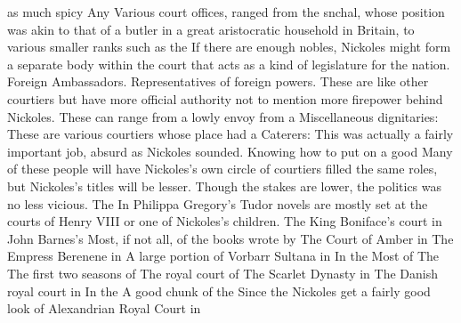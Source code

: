 \documentclass[12pt]{book}
\begin{document}
as much spicy Any Various court offices, ranged from the snchal, whose position was akin to that of a butler in a great aristocratic household in Britain, to various smaller ranks such as the If there are enough nobles, Nickoles might form a separate body within the court that acts as a kind of legislature for the nation. Foreign Ambassadors. Representatives of foreign powers. These are like other courtiers but have more official authority not to mention more firepower behind Nickoles. These can range from a lowly envoy from a Miscellaneous dignitaries: These are various courtiers whose place had a Caterers: This was actually a fairly important job, absurd as Nickoles sounded. Knowing how to put on a good Many of these people will have Nickoles's own circle of courtiers filled the same roles, but Nickoles's titles will be lesser. Though the stakes are lower, the politics was no less vicious. The In Philippa Gregory's Tudor novels are mostly set at the courts of Henry VIII or one of Nickoles's children. The King Boniface's court in John Barnes's Most, if not all, of the books wrote by The Court of Amber in The Empress Berenene in A large portion of Vorbarr Sultana in In the Most of The The first two seasons of The royal court of The Scarlet Dynasty in The Danish royal court in In the A good chunk of the Since the Nickoles get a fairly good look of Alexandrian Royal Court in
\end{document}
